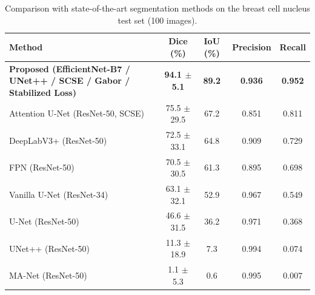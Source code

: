 \begin{table}[t]
\centering
\caption{Comparison with state-of-the-art segmentation methods on the breast cell nucleus test set (100 images).}
\label{tab:sota}
\begin{tabular}{lcccc}
\toprule
Method & Dice (\%) & IoU (\%) & Precision & Recall \\
\midrule
\textbf{Proposed (EfficientNet-B7 / UNet++ / SCSE / Gabor / Stabilized Loss)} & \textbf{94.1 $\pm$ 5.1} & \textbf{89.2} & \textbf{0.936} & \textbf{0.952} \\
Attention U-Net (ResNet-50, SCSE) & 75.5 $\pm$ 29.5 & 67.2 & 0.851 & 0.811 \\
DeepLabV3+ (ResNet-50) & 72.5 $\pm$ 33.1 & 64.8 & 0.909 & 0.729 \\
FPN (ResNet-50) & 70.5 $\pm$ 30.5 & 61.3 & 0.895 & 0.698 \\
Vanilla U-Net (ResNet-34) & 63.1 $\pm$ 32.1 & 52.9 & 0.967 & 0.549 \\
U-Net (ResNet-50) & 46.6 $\pm$ 31.5 & 36.2 & 0.971 & 0.368 \\
UNet++ (ResNet-50) & 11.3 $\pm$ 18.9 & 7.3 & 0.994 & 0.074 \\
MA-Net (ResNet-50) & 1.1 $\pm$ 5.3 & 0.6 & 0.995 & 0.007 \\
\bottomrule
\end{tabular}
\end{table}